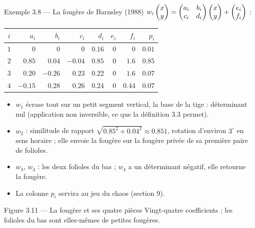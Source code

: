 \begin{frame}{Exemple 3.8 --- La fougère de Barnsley (1988)}
  \small
  $w_i\begin{pmatrix}x\\ y\end{pmatrix} = \begin{pmatrix}a_i & b_i\\ c_i & d_i\end{pmatrix}\begin{pmatrix}x\\ y\end{pmatrix}+\begin{pmatrix}e_i\\ f_i\end{pmatrix}$ :
  \begin{center}
  \small
  \begin{tabular}{crrrrrrr}
    \toprule
    $i$ & $a_i$ & $b_i$ & $c_i$ & $d_i$ & $e_i$ & $f_i$ & $p_i$ \\
    \midrule
    $1$ & $0$ & $0$ & $0$ & $\num{0.16}$ & $0$ & $0$ & $\num{0.01}$ \\
    $2$ & $\num{0.85}$ & $\num{0.04}$ & $\num{-0.04}$ & $\num{0.85}$ & $0$ & $\num{1.6}$ & $\num{0.85}$ \\
    $3$ & $\num{0.20}$ & $\num{-0.26}$ & $\num{0.23}$ & $\num{0.22}$ & $0$ & $\num{1.6}$ & $\num{0.07}$ \\
    $4$ & $\num{-0.15}$ & $\num{0.28}$ & $\num{0.26}$ & $\num{0.24}$ & $0$ & $\num{0.44}$ & $\num{0.07}$ \\
    \bottomrule
  \end{tabular}
  \end{center}
  \footnotesize
  \begin{itemize}
    \item $w_1$ écrase tout sur un petit segment vertical, la base de la
      tige : déterminant nul (application non inversible, ce que la
      définition 3.3 permet).
    \item $w_2$ : similitude de rapport
      $\sqrt{\num{0.85}^2+\num{0.04}^2}\approx\num{0.851}$, rotation
      d'environ $3^\circ$ en sens horaire ; elle envoie la fougère sur la
      fougère privée de sa première paire de folioles.
    \item $w_3$, $w_4$ : les deux folioles du bas ; $w_4$ a un déterminant
      négatif, elle retourne la fougère.
    \item La colonne $p_i$ servira au jeu du chaos (section 9).
  \end{itemize}
\end{frame}

\begin{frame}{Figure 3.11 --- La fougère et ses quatre pièces}
  \small Vingt-quatre coefficients ; les folioles du bas sont elles-mêmes
  de petites fougères.
\end{frame}

